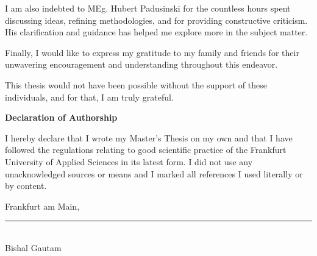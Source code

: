 {\begin{titlepage}
    I am also indebted to MEg. Hubert Padusinski for the countless hours spent discussing ideas, refining methodologies, and for providing constructive criticism. His clarification and guidance has helped me explore more in the subject matter.

    Finally, I would like to express my gratitude to my family and friends for their unwavering encouragement and understanding throughout this endeavor.

    This thesis would not have been possible without the support of these individuals, and for that, I am truly grateful.
 \vspace*{\fill}
\end{titlepage}





\begin{titlepage}
    \vspace*{\fill}
    {\Large\textbf{Declaration of Authorship}\par}\bigskip%
    I hereby declare that I wrote my Master's Thesis on my own and that I have followed the regulations relating to good scientific practice of the Frankfurt University of Applied Sciences in its latest form. I did not use any unacknowledged sources or means and I marked all references I used literally or by content.\par\bigskip%
    Frankfurt am Main, \EndDatum\par\vspace{5ex}%
    \vspace{2ex}
    \rule{4cm}{0.4pt} %
    \vspace{0.5em} \\ Bishal Gautam
    \vspace*{\fill}
\end{titlepage}



}

\maketitle
